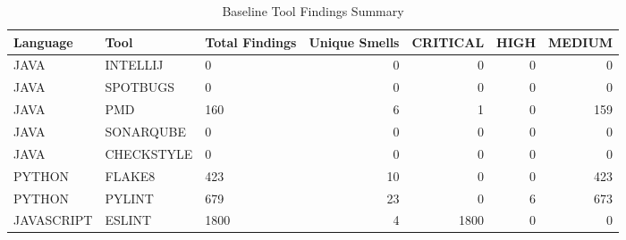 \begin{table}
\caption{Baseline Tool Findings Summary}
\label{tab:baseline_summary}
\begin{tabular}{lllrrrr}
\toprule
Language & Tool & Total Findings & Unique Smells & CRITICAL & HIGH & MEDIUM \\
\midrule
JAVA & INTELLIJ & 0 & 0 & 0 & 0 & 0 \\
JAVA & SPOTBUGS & 0 & 0 & 0 & 0 & 0 \\
JAVA & PMD & 160 & 6 & 1 & 0 & 159 \\
JAVA & SONARQUBE & 0 & 0 & 0 & 0 & 0 \\
JAVA & CHECKSTYLE & 0 & 0 & 0 & 0 & 0 \\
PYTHON & FLAKE8 & 423 & 10 & 0 & 0 & 423 \\
PYTHON & PYLINT & 679 & 23 & 0 & 6 & 673 \\
JAVASCRIPT & ESLINT & 1800 & 4 & 1800 & 0 & 0 \\
\bottomrule
\end{tabular}
\end{table}
